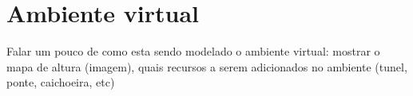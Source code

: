 \section{Ambiente virtual}
Falar um pouco de como esta sendo modelado o ambiente virtual: mostrar o mapa de altura (imagem), quais recursos a serem adicionados no ambiente (tunel, ponte, caichoeira, etc)